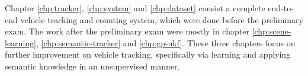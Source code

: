 Chapter \ref{chp:tracker}, \ref{chp:system} and \ref{chp:dataset} consist a complete end-to-end vehicle tracking and counting system, which were done before the preliminary exam.
The work after the preliminary exam were mostly in chapter \ref{chp:scene-learning}, \ref{chp:semantic-tracker} and \ref{chp:gp-ukf}.
These three chapters focus on further improvement on vehicle tracking, specifically via learning and applying semantic knowledge in an unsupervised manner. 